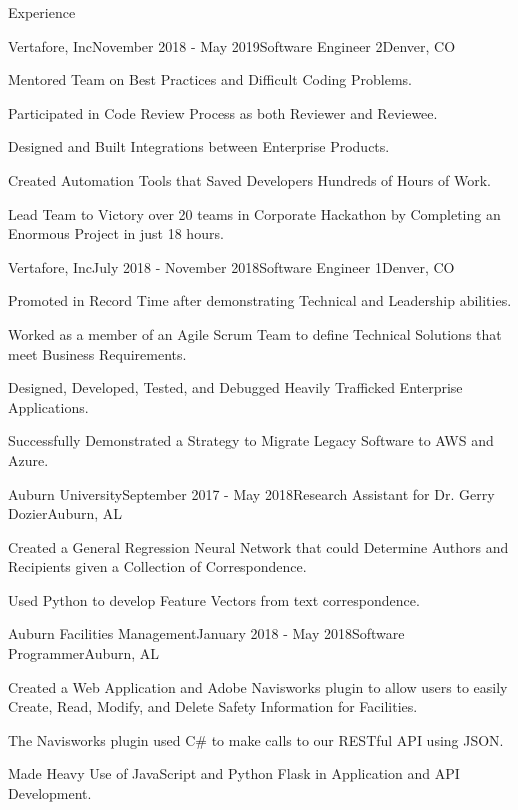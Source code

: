 \documentclass{resume} %
\begin{document}
\begin{rSection}{Experience}

\begin{rSubsection}{Vertafore, Inc}{November 2018 - May 2019}{Software Engineer 2}{Denver, CO}
\item Mentored Team on Best Practices and Difficult Coding Problems.
\item Participated in Code Review Process as both Reviewer and Reviewee. 
\item Designed and Built Integrations between Enterprise Products.
\item Created Automation Tools that Saved Developers Hundreds of Hours of Work. 
\item Lead Team to Victory over 20 teams in Corporate Hackathon by Completing an Enormous Project in just 18 hours.
\end{rSubsection}

\begin{rSubsection}{Vertafore, Inc}{July 2018 - November 2018}{Software Engineer 1}{Denver, CO}
\item Promoted in Record Time after demonstrating Technical and Leadership abilities.
\item Worked as a member of an Agile Scrum Team to define Technical Solutions that meet Business Requirements. 
\item Designed, Developed, Tested, and Debugged Heavily Trafficked Enterprise Applications. 
\item Successfully Demonstrated a Strategy to Migrate Legacy Software to AWS and Azure. 
\end{rSubsection}


\begin{rSubsection}{Auburn University}{September 2017 - May 2018}{Research Assistant for Dr. Gerry Dozier}{Auburn, AL}
\item Created a General Regression Neural Network that could Determine Authors and Recipients given a Collection of Correspondence.
\item Used Python to develop Feature Vectors from text correspondence.
\end{rSubsection}


\begin{rSubsection}{Auburn Facilities Management}{January 2018 - May 2018}{Software Programmer}{Auburn, AL}
\item Created a Web Application and Adobe Navisworks plugin to allow users to easily Create, Read, Modify, and Delete Safety Information for Facilities.
\item The Navisworks plugin used C\# to make calls to our RESTful API using JSON.
\item Made Heavy Use of JavaScript and Python Flask in Application and API Development.
\end{rSubsection}

\end{rSection}
\end{document}
